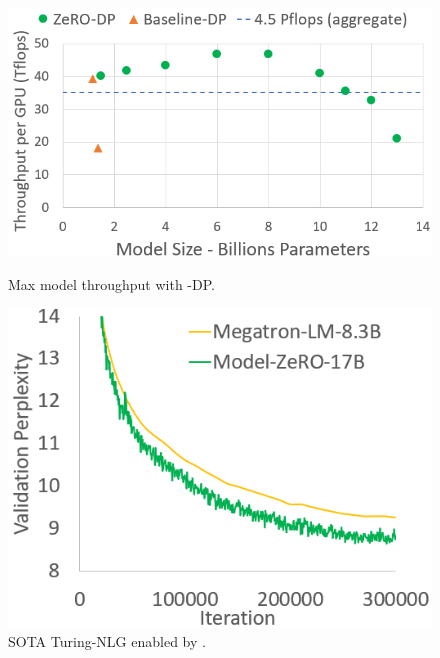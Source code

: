 \begin{figure}
   \begin{minipage}[b]{0.55\columnwidth}
    \centering
       \includegraphics[width=\textwidth]{max_data_parallel_throughput.PNG}
        \caption{Max model throughput with \name-DP.} \label{fig:dp_tput}
   \vspace{0.04in}
   \end{minipage}
   \quad
   \begin{minipage}[b]{0.4\columnwidth}
    \centering
       \includegraphics[width=\textwidth]{turing_nlg_17B.PNG}
        \caption{SOTA Turing-NLG enabled by \name.} \label{fig:turing_nlg_17B}
      \vspace{0.08in}
   \end{minipage}
\end{figure}
